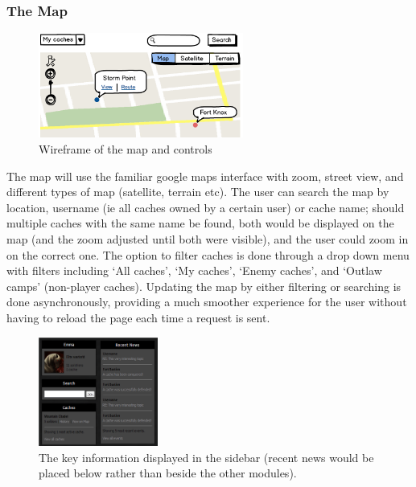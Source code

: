 \subsubsection{The Map}

\begin{figure}
\vspace{-40pt}
	\begin{center}
	\includegraphics[width=0.6\textwidth]{images/map_wireframe}
	\caption{Wireframe of the map and controls}
	\label{map_wireframe}
	\end{center}
	\vspace{-10pt}
\end{figure}

The map will use the familiar google maps interface with zoom, street view, and different types of map (satellite, terrain etc). The user can search the map by location, username (ie all caches owned by a certain user) or cache name; should multiple caches with the same name be found, both would be displayed on the map (and the zoom adjusted until both were visible), and the user could zoom in on the correct one. The option to filter caches is done through a drop down menu with filters including `All caches', `My caches', `Enemy caches', and `Outlaw camps' (non-player caches). Updating the map by either filtering or searching is done asynchronously, providing a much smoother experience for the user without having to reload the page each time a request is sent.

\begin{figure}
	\vspace{-20pt}
	\begin{center}
	\includegraphics[width=0.35\textwidth]{images/sidebar}
	\caption{The key information displayed in the sidebar (recent news would be placed below rather than beside the other modules).}
	\label{sidebar}
	\end{center}
	\vspace{-80pt}
\end{figure}

